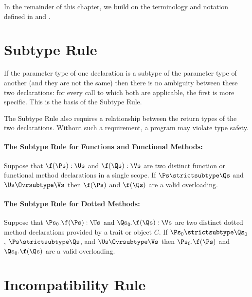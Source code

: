 In the remainder of this chapter, we build on the terminology and
notation defined in 
and .



\section{Subtype Rule}

If the parameter type of one declaration is a subtype of the parameter
type of another (and they are not the same) then there is no
ambiguity between these two declarations: for every call to which both
are applicable, the first is more specific.  This is the basis of the
Subtype Rule.

The Subtype Rule also requires a relationship between the return types
of the two declarations.  Without such a requirement, a program may
violate type safety.

\paragraph{The Subtype Rule for Functions and Functional Methods:}
Suppose that $\f(\Ps) : \Us$ and $\f(\Qs) : \Vs$ are two distinct
function or functional method declarations in a single scope.
If $\Ps \strictsubtype \Qs$ and $\Us \Ovrsubtype \Vs$ then $\f(\Ps)$ and
$\f(\Qs)$ are a valid overloading.

\paragraph{The Subtype Rule for Dotted Methods:}
Suppose that $\Ps_0.\f(\Ps) : \Us$ and $\Qs_0.\f(\Qs) : \Vs$ are two
distinct dotted method declarations provided by a trait or object $C$.
If $\Ps_0 \strictsubtype \Qs_0$, $\Ps \strictsubtype \Qs$,
and $\Us \Ovrsubtype
\Vs$ then $\Ps_0.\f(\Ps)$ and $\Qs_0.\f(\Qs)$ are a valid overloading.

\section{Incompatibility Rule}

